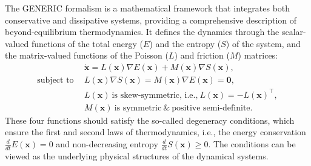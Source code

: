 \documentclass[final]{siamltex}
\newcommand{\bfa}[1]{\boldsymbol{#1}}
\begin{document}
The GENERIC formalism \cite{grmela1997dynamics,ottinger2005beyond} is a mathematical framework that integrates both conservative and dissipative systems, providing a comprehensive description of beyond-equilibrium thermodynamics. It defines the dynamics through the scalar-valued functions of the total energy ($E$) and the entropy ($S$) of the system, and the matrix-valued functions of the Poisson ($L$) and friction ($M$) matrices:
\begin{equation}
\label{eq:GENERIC}
\begin{split}
&\dot{\bfa{x}} = L(\bfa{x}) \nabla E(\bfa{x}) +M(\bfa{x}) \nabla S(\bfa{x}), \\
\textrm{subject to} \ \ &L(\bfa{x}) \nabla S(\bfa{x}) = M(\bfa{x}) \nabla E(\bfa{x}) = \bfa{0}, \\
&L(\bfa{x}) \ \textrm{is skew-symmetric, i.e.,} \ L(\bfa{x}) = -L(\bfa{x})^\top,\\
&M(\bfa{x}) \ \textrm{is symmetric} \ \& \ \textrm{positive semi-definite.} 
\end{split}
\end{equation}
These four functions should satisfy the so-called degeneracy conditions, which ensure the first and second laws of thermodynamics, i.e., the energy conservation $\frac{d}{dt}E(\bfa{x}) = 0$ and non-decreasing entropy $\frac{d}{dt}S(\bfa{x}) \geq 0$.
The conditions can be viewed as the underlying physical structures of the dynamical systems.
\end{document}
